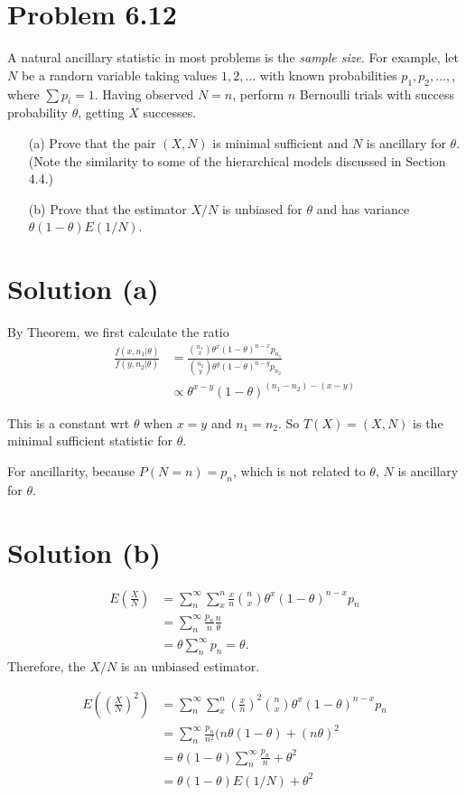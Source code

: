 \documentclass{article} %
\newcommand{\solution}[1]{\section*{Solution #1}}
\begin{document}
\section*{Problem 6.12}
A natural ancillary statistic in most problems is the \textit{sample size}. For example, let $N$ be a randorn variable taking values $1,2, \dots$ with known probabilities $p_1, p_2, \dots,$, where $\sum p_i = 1$. Having observed $N = n$, perform $n$ Bernoulli trials with success probability $\theta$, getting $X$ successes. \\
\begin{itemize}
    \item[(a)] Prove that the pair $(X, N)$ is minimal sufficient and $N$ is ancillary for $\theta$. (Note the similarity to some of the hierarchical models discussed in Section 4.4.)
    \item[(b)] Prove that the estimator $X/N$ is unbiased for $\theta$ and has variance $\theta(1-\theta)E(1/N)$.
\end{itemize}

\solution{(a)}
By Theorem, we first calculate the ratio
\begin{align*}
        \frac{f(x, n_1| \theta)}{f(y, n_2| \theta)} &= \frac{{n_1 \choose x} \theta^x (1-\theta)^{n-x}p_{n_1}}{{n_2 \choose y} \theta^y (1-\theta)^{n-y}p_{n_2}} \\
        &\propto \theta^{x-y}(1-\theta)^{(n_1-n_2)-(x-y)}
\end{align*}

This is a constant wrt $\theta$ when $x = y$ and $n_1 = n_2$. So $T(X) = (X, N)$ is the minimal sufficient statistic for $\theta$.

For ancillarity, because $P(N=n) = p_n$, which is not related to $\theta$, $N$ is ancillary for $\theta$.

 
\solution{(b)}

\begin{align*}
    E(\frac{X}{N}) &= \sum \limits_n^{\infty} \sum \limits_x^n \frac{x}{n} {n \choose x} \theta^x(1-\theta)^{n-x}p_n \\
    &= \sum \limits_n^\infty \frac{p_n}{n} \frac{n}{\theta} \\
    &= \theta \sum \limits_n^\infty p_n = \theta.
\end{align*}
Therefore, the $X/N$ is an unbiased estimator.

\begin{align*}
    E((\frac{X}{N})^2) &= \sum \limits_n^\infty \sum \limits_x^n (\frac{x}{n})^2 {n \choose x} \theta^x(1-\theta)^{n-x}p_n \\
    &= \sum \limits_n^\infty \frac{p_n}{n^2} (n\theta(1-\theta) + (n\theta)^2 \\
    &=\theta(1-\theta)\sum \limits_n^\infty \frac{p_n}{n} + \theta^2 \\
    &= \theta(1-\theta)E(1/N) + \theta^2
\end{align*}
\end{document}
